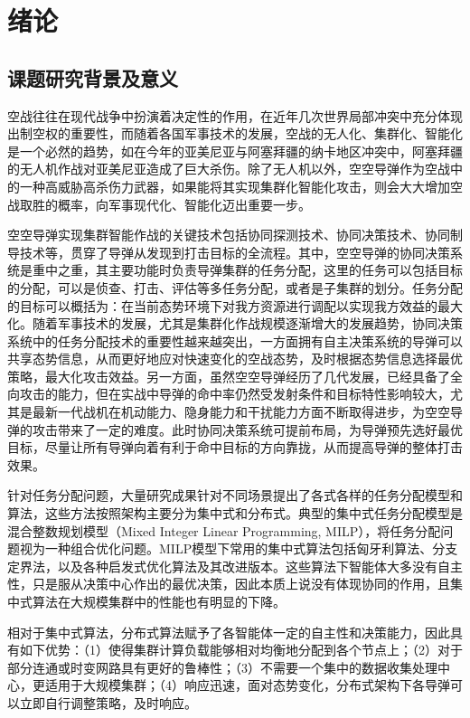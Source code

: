 
\chapter{绪论}
\label{chap:intro}

\section{课题研究背景及意义}
\label{intro:sec:bg}

空战往往在现代战争中扮演着决定性的作用，在近年几次世界局部冲突中充分体现出制空权的重要性，而随着各国军事技术的发展，空战的无人化、集群化、智能化是一个必然的趋势，如在今年的亚美尼亚与阿塞拜疆的纳卡地区冲突中，阿塞拜疆的无人机作战对亚美尼亚造成了巨大杀伤。除了无人机以外，空空导弹作为空战中的一种高威胁高杀伤力武器，如果能将其实现集群化智能化攻击，则会大大增加空战取胜的概率，向军事现代化、智能化迈出重要一步。

空空导弹实现集群智能作战的关键技术包括协同探测技术、协同决策技术、协同制导技术等，贯穿了导弹从发现到打击目标的全流程。其中，空空导弹的协同决策系统是重中之重，其主要功能时负责导弹集群的任务分配，这里的任务可以包括目标的分配，可以是侦查、打击、评估等多任务分配，或者是子集群的划分。任务分配的目标可以概括为：在当前态势环境下对我方资源进行调配以实现我方效益的最大化。随着军事技术的发展，尤其是集群化作战规模逐渐增大的发展趋势，协同决策系统中的任务分配技术的重要性越来越突出，一方面拥有自主决策系统的导弹可以共享态势信息，从而更好地应对快速变化的空战态势，及时根据态势信息选择最优策略，最大化攻击效益。另一方面，虽然空空导弹经历了几代发展，已经具备了全向攻击的能力，但在实战中导弹的命中率仍然受发射条件和目标特性影响较大，尤其是最新一代战机在机动能力、隐身能力和干扰能力方面不断取得进步，为空空导弹的攻击带来了一定的难度。此时协同决策系统可提前布局，为导弹预先选好最优目标，尽量让所有导弹向着有利于命中目标的方向靠拢，从而提高导弹的整体打击效果。

针对任务分配问题，大量研究成果针对不同场景提出了各式各样的任务分配模型和算法，这些方法按照架构主要分为集中式和分布式。典型的集中式任务分配模型是混合整数规划模型（Mixed Integer Linear Programming, MILP），将任务分配问题视为一种组合优化问题。MILP模型下常用的集中式算法包括匈牙利算法、分支定界法，以及各种启发式优化算法及其改进版本。这些算法下智能体大多没有自主性，只是服从决策中心作出的最优决策，因此本质上说没有体现协同的作用，且集中式算法在大规模集群中的性能也有明显的下降。

相对于集中式算法，分布式算法赋予了各智能体一定的自主性和决策能力，因此具有如下优势：（1）使得集群计算负载能够相对均衡地分配到各个节点上；（2）对于部分连通或时变网路具有更好的鲁棒性；（3）不需要一个集中的数据收集处理中心，更适用于大规模集群；（4）响应迅速，面对态势变化，分布式架构下各导弹可以立即自行调整策略，及时响应。

